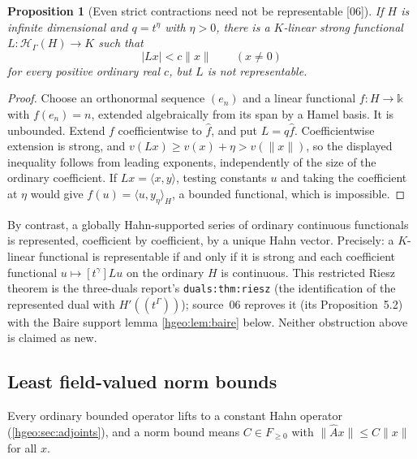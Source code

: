 \documentclass[11pt,letterpaper]{article}
\numberwithin{equation}{section}
\newtheorem{proposition}[proposition]{Proposition}
\theoremstyle{definition}
\theoremstyle{remark}
\newcommand{\kk}{\mathbb k}
\newcommand{\F}{F}
\newcommand{\K}{K}
\newcommand{\HH}[1]{\mathscr H_\Gamma(#1)}
\newcommand{\ip}[2]{\langle #1,#2\rangle}
\newcommand{\norm}[1]{\lVert #1\rVert}
\newcommand{\abs}[1]{\lvert #1\rvert}
\newcommand{\coeff}[2]{[t^{#1}]#2}
\newcommand{\src}[1]{\textup{\textsf{\small[#1]}}}
\newcommand{\replabel}[1]{\nolinkurl{#1}}
\begin{document}
\begin{proposition}[Even strict contractions need not be representable
\src{06}]\label{hgeo:prop:badfunctional}
If $H$ is infinite dimensional and $q=t^\eta$ with $\eta>0$, there is a
$\K$-linear strong functional $L:\HH{H}\to\K$ such that
\[
 \abs{Lx}<c\norm{x}\qquad(x\ne0)
\]
for every positive ordinary real $c$, but $L$ is not representable.
\end{proposition}
\begin{proof}
Choose an orthonormal sequence $(e_n)$ and a linear functional
$f:H\to\kk$ with $f(e_n)=n$, extended algebraically from its span by a Hamel
basis. It is unbounded. Extend $f$ coefficientwise to $\widehat f$, and put
$L=q\widehat f$. Coefficientwise extension is strong, and
$v(Lx)\ge v(x)+\eta>v(\norm x)$, so the displayed inequality follows from
leading exponents, independently of the size of the ordinary coefficient.
If $Lx=\ip{x}{y}$, testing constants $u$ and taking the coefficient at
$\eta$ would give $f(u)=\ip{u}{y_\eta}_H$, a bounded functional, which is
impossible.
\end{proof}

By contrast, a globally Hahn-supported series of ordinary continuous
functionals is represented, coefficient by coefficient, by a unique Hahn
vector. Precisely: a $\K$-linear functional is representable if and only if
it is strong and each coefficient functional $u\mapsto\coeff{\gamma}{Lu}$ on
the ordinary $H$ is continuous. This restricted Riesz theorem is the
three-duals report's \replabel{duals:thm:riesz} (the identification of the
represented dual with $H'((t^\Gamma))$); source~06 reproves it
(its Proposition~5.2) with the Baire support lemma
\cref{hgeo:lem:baire} below. Neither obstruction above is claimed as new.

\subsection{Least field-valued norm bounds}
Every ordinary bounded operator lifts to a constant Hahn operator
(\cref{hgeo:sec:adjoints}), and a norm bound means $C\in\F_{\ge0}$ with
$\norm{\widehat Ax}\le C\norm{x}$ for all $x$.
\end{document}

